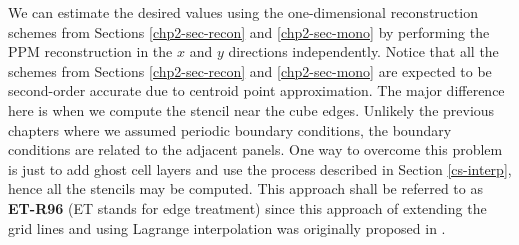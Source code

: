 We can estimate the desired values using the one-dimensional reconstruction schemes from Sections \ref{chp2-sec-recon} and \ref{chp2-sec-mono}
by performing the PPM reconstruction in the $x$ and $y$ directions independently.
Notice that all the schemes from Sections \ref{chp2-sec-recon} and \ref{chp2-sec-mono} are expected to be second-order accurate due to centroid point approximation.
The major difference here is when we compute the stencil near the cube edges. 
Unlikely the previous chapters where we assumed periodic boundary conditions, the boundary conditions are related to the adjacent panels.
One way to overcome this problem is just to add ghost cell layers and use the process described in Section \ref{cs-interp}, hence
all the stencils may be computed. 
This approach shall be referred to as \textbf{ET-R96} (ET stands for edge treatment) since this approach of extending the grid lines and using Lagrange interpolation was originally proposed in \citet{ronchi:1996}.

